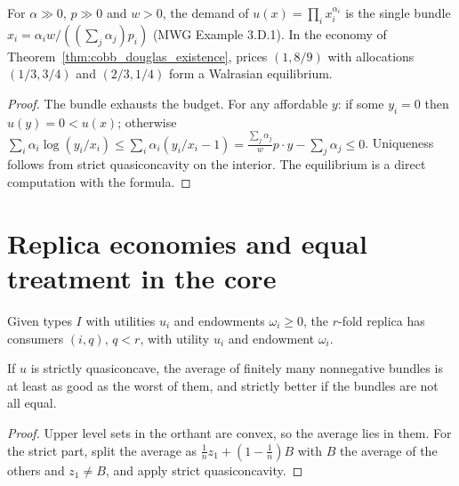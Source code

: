 \begin{theorem}
\label{thm:cobb_douglas_demand}
\leanok
{}
For $\alpha \gg 0$, $p \gg 0$ and $w > 0$, the demand of $u(x) = \prod_i x_i^{\alpha_i}$ is the single bundle
$x_i = \alpha_i w / ((\sum_j \alpha_j) p_i)$ (MWG Example 3.D.1). In the economy of Theorem~\ref{thm:cobb_douglas_existence},
prices $(1, 8/9)$ with allocations $(1/3, 3/4)$ and $(2/3, 1/4)$ form a Walrasian equilibrium.
\end{theorem}
\begin{proof}
\leanok
The bundle exhausts the budget. For any affordable $y$: if some $y_i = 0$ then $u(y) = 0 < u(x)$; otherwise
$\sum_i \alpha_i \log(y_i/x_i) \le \sum_i \alpha_i (y_i/x_i - 1) = \frac{\sum_j \alpha_j}{w} p \cdot y - \sum_j \alpha_j \le 0$.
Uniqueness follows from strict quasiconcavity on the interior. The equilibrium is a direct computation with the formula.
\end{proof}

\section{Replica economies and equal treatment in the core}
\label{sec:replica}

\begin{definition}
\label{def:replica}
\leanok
Given types $I$ with utilities $u_i$ and endowments $\omega_i \ge 0$, the $r$-fold replica has consumers $(i, q)$,
$q < r$, with utility $u_i$ and endowment $\omega_i$.
\end{definition}

\begin{lemma}
\label{lem:qc_average}
\leanok
If $u$ is strictly quasiconcave, the average of finitely many nonnegative bundles is at least as good as the worst of
them, and strictly better if the bundles are not all equal.
\end{lemma}
\begin{proof}
\leanok
Upper level sets in the orthant are convex, so the average lies in them. For the strict part, split the average as
$\frac1n z_1 + (1-\frac1n) B$ with $B$ the average of the others and $z_1 \ne B$, and apply strict quasiconcavity.
\end{proof}

